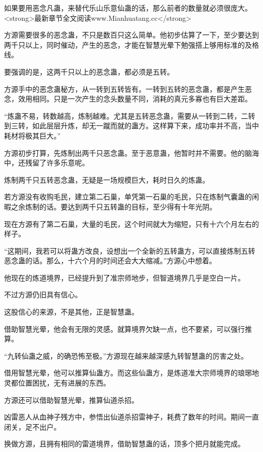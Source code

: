 
\begin{this_body}

如果要用恶念凡蛊，来替代乐山乐意仙蛊的话，那么前者的数量就必须很庞大。<strong>最新章节全文阅读www.Mianhuatang.cc</strong>

方源需要很多的恶念蛊，不只是数百只这么简单。他初步估算了一下，至少要达到两千只以上，同时催动，产生的恶念，才能在智慧光晕下勉强搭上够用标准的及格线。

要强调的是，这两千只以上的恶念蛊，都必须是五转。

方源手中的恶念蛊秘方，从一转到五转皆有。一转到五转的恶念蛊，都是产生恶念，效用相同。只是一次产生的念头数量不同，消耗的真元多寡也有巨大差距。

“炼蛊不易，转数越高，炼制越难。尤其是五转恶念蛊，需要从一转到二转，二转到三转，如此层层升炼，却无一蹴而就的蛊方。这样算下来，成功率并不高，当中耗材将极其巨大。”

方源初步打算，先炼制出两千只恶念蛊。至于恶意蛊，他暂时并不需要。他的脑海中，还残留了许多乐意呢。

炼制两千只五转恶念蛊，无疑是一场规模巨大，耗时日久的炼蛊。

若方源没有收购毛民，建立第二石巢，单凭第一石巢的毛民，只在炼制气囊蛊的闲暇之余炼制的话。要达到两千只五转蛊的目标，至少得有十年光阴。

现在方源有了第二石巢，大量的毛民，这个时间就大为缩短，只有十六个月左右的样子。

“这期间，我若可以将蛊方改良，设想出一个全新的五转蛊方，可以直接炼制五转恶念蛊的话。那么，十六个月的时间还会大大缩减。”方源心中想着。

他现在的炼道境界，已经提升到了准宗师地步，但智道境界几乎是空白一片。

不过方源仍旧具有信心。

这股信心的来源，不是其他，正是智慧蛊。

借助智慧光晕，他会有无限的灵感。就算境界欠缺一点，也不要紧，可以强行推算。

“九转仙蛊之威，的确恐怖至极。”方源现在越来越深感九转智慧蛊的厉害之处。

借用智慧光晕，他可以推算仙蛊方。而这些仙蛊方，是炼道准大宗师境界的琅琊地灵都位置困扰，无有进展的东西。

方源还可以借助智慧光晕，推算仙道杀招。

凶雷恶人从血神子残方中，参悟出仙道杀招雷神子，耗费了数年的时间。期间一直闭关，足不出户。

换做方源，且拥有相同的雷道境界，借助智慧蛊的话，顶多个把月就能完成。


\end{this_body}
